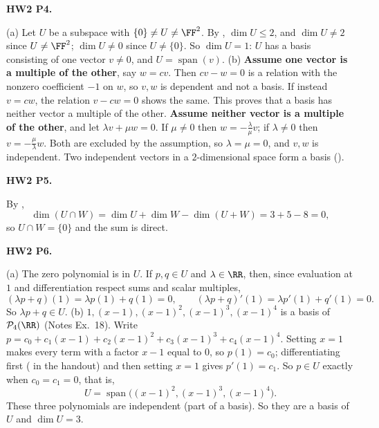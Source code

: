 \documentclass[10pt]{scrartcl}
\DeclareMathOperator{\spn}{span}
\newcommand{\PP}{\mathcal P}
\begin{document}
\begin{prob}\textbf{HW2 P4.}\par{}
\begin{steps}
  \ii (a) Let $U$ be a subspace with $\{0\}\ne U\ne\FF^2$. By , $\dim U\le2$, and $\dim U\ne2$ since $U\ne\FF^2$; $\dim U\ne0$ since $U\ne\{0\}$. So $\dim U=1$: $U$ has a basis consisting of one vector $v\ne0$, and $U=\spn(v)$.
  \ii (b) \textbf{Assume one vector is a multiple of the other}, say $w=cv$. Then $cv-w=0$ is a relation with the nonzero coefficient $-1$ on $w$, so $v,w$ is dependent and not a basis. If instead $v=cw$, the relation $v-cw=0$ shows the same. This proves that a basis has neither vector a multiple of the other.
  \ii \textbf{Assume neither vector is a multiple of the other}, and let $\lambda v+\mu w=0$. If $\mu\ne0$ then $w=-\frac\lambda\mu v$; if $\lambda\ne0$ then $v=-\frac\mu\lambda w$. Both are excluded by the assumption, so $\lambda=\mu=0$, and $v,w$ is independent. Two independent vectors in a $2$-dimensional space form a basis ().
\end{steps}
\end{prob}

\begin{prob}\textbf{HW2 P5.}\par{}
By ,
\[
  \dim(U\cap W)=\dim U+\dim W-\dim(U+W)=3+5-8=0,
\]
so $U\cap W=\{0\}$ and the sum is direct.
\end{prob}

\begin{prob}\textbf{HW2 P6.}\par{}
\begin{steps}
  \ii (a) The zero polynomial is in $U$. If $p,q\in U$ and $\lambda\in\RR$, then, since evaluation at $1$ and differentiation respect sums and scalar multiples,
  \[
    (\lambda p+q)(1)=\lambda p(1)+q(1)=0,\qquad (\lambda p+q)'(1)=\lambda p'(1)+q'(1)=0.
  \]
  So $\lambda p+q\in U$.
  \ii (b) $1,(x-1),(x-1)^2,(x-1)^3,(x-1)^4$ is a basis of $\PP_4(\RR)$ (Notes Ex.~18). Write $p=c_0+c_1(x-1)+c_2(x-1)^2+c_3(x-1)^3+c_4(x-1)^4$.
  \ii Setting $x=1$ makes every term with a factor $x-1$ equal to $0$, so $p(1)=c_0$; differentiating first ( in the handout) and then setting $x=1$ gives $p'(1)=c_1$. So $p\in U$ exactly when $c_0=c_1=0$, that is,
  \[
    U=\spn\bigl((x-1)^2,(x-1)^3,(x-1)^4\bigr).
  \]
  \ii These three polynomials are independent (part of a basis). So they are a basis of $U$ and $\dim U=3$.
\end{steps}
\end{prob}
\end{document}
